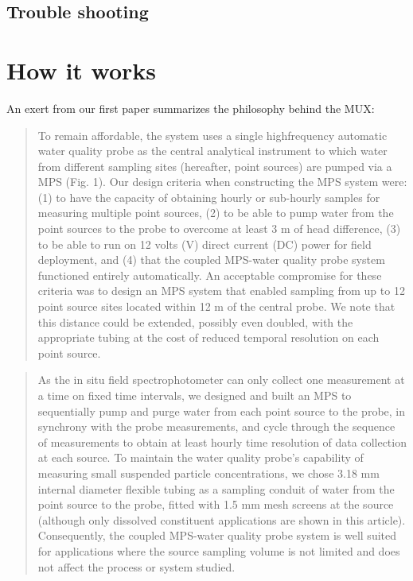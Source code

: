 \documentclass[]{book}
\begin{document}
\hypertarget{trouble-shooting}{%
\section{Trouble shooting}\label{trouble-shooting}}

\hypertarget{how-it-works-1}{%
\chapter{How it works}\label{how-it-works-1}}

An exert from our first paper \citep{Birgand2016-to} summarizes the philosophy behind the MUX:

\begin{quote}
To remain affordable, the system uses a single highfrequency automatic water quality probe as the central analytical
instrument to which water from different sampling sites (hereafter, point sources) are pumped via a MPS (Fig. 1). Our design criteria when constructing the MPS system were: (1) to have the capacity of obtaining hourly or sub-hourly samples for measuring multiple point sources, (2) to be able to pump water from the point sources to the probe to overcome at least 3 m of head difference, (3) to be able to run on 12 volts (V) direct current (DC) power for field deployment, and (4) that the coupled MPS-water quality probe system functioned entirely automatically. An acceptable compromise for these criteria was to design an MPS system that enabled sampling from up to 12 point source sites located within 12 m of the central probe. We note that this distance could be extended, possibly even doubled, with the appropriate tubing at the cost of reduced temporal resolution on each point source.
\end{quote}

\begin{quote}
As the in situ field spectrophotometer can only collect one measurement at a time on fixed time intervals, we designed and built an MPS to sequentially pump and purge water from each point source to the probe, in synchrony with the probe measurements, and cycle through the sequence of measurements to obtain at least hourly time resolution of data collection at each source. To maintain the water quality probe's capability of measuring small suspended particle concentrations, we chose 3.18 mm internal diameter flexible tubing as a sampling conduit of water from the point source to the probe, fitted with 1.5 mm mesh screens at the source (although only dissolved constituent applications are shown in this article). Consequently, the coupled MPS-water quality probe system is well suited for applications where the source sampling volume is not limited and does not affect the process or system studied.
\end{quote}
\end{document}
